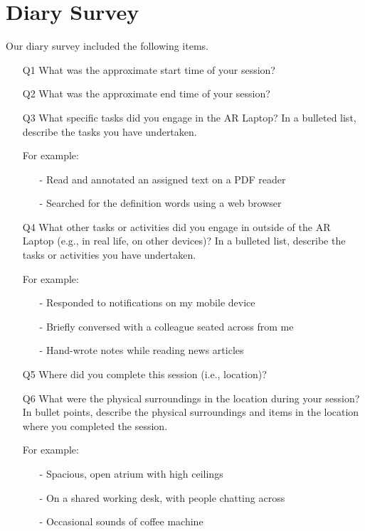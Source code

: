 \section{Diary Survey}
Our diary survey included the following items. 
\begin{enumerate}
\item[Q1] What was the approximate start time of your session?
\item[Q2] What was the approximate end time of your session?
\item[Q3] What specific tasks did you engage in the AR Laptop?
In a bulleted list, describe the tasks you have undertaken. 

For example:
\begin{itemize}
    \item[-] Read and annotated an assigned text on a PDF reader
    \item[-] Searched for the definition words using a web browser
\end{itemize}

\item[Q4] What other tasks or activities did you engage in outside of the AR Laptop (e.g., in real life, on other devices)?
In a bulleted list, describe the tasks or activities you have undertaken. 

For example:
\begin{itemize} 
\item[-] Responded to notifications on my mobile device
\item[-] Briefly conversed with a colleague seated across from me
\item[-] Hand-wrote notes while reading news articles
\end{itemize}

\item[Q5] Where did you complete this session (i.e., location)?

\item[Q6] What were the physical surroundings in the location during your session? 
In bullet points, describe the physical surroundings and items in the location where you completed the session.

For example:
\begin{itemize}
\item[-] Spacious, open atrium with high ceilings
\item[-] On a shared working desk, with people chatting across
\item[-] Occasional sounds of coffee machine
\end{itemize}


\end{enumerate}

